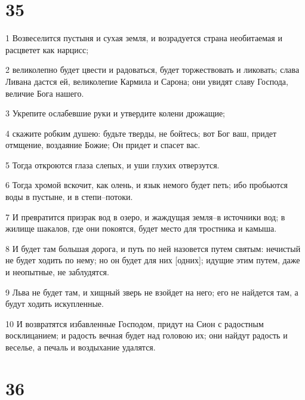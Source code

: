 \chapter{35}

\par 1 Возвеселится пустыня и сухая земля, и возрадуется страна необитаемая и расцветет как нарцисс;
\par 2 великолепно будет цвести и радоваться, будет торжествовать и ликовать; слава Ливана дастся ей, великолепие Кармила и Сарона; они увидят славу Господа, величие Бога нашего.
\par 3 Укрепите ослабевшие руки и утвердите колени дрожащие;
\par 4 скажите робким душею: будьте тверды, не бойтесь; вот Бог ваш, придет отмщение, воздаяние Божие; Он придет и спасет вас.
\par 5 Тогда откроются глаза слепых, и уши глухих отверзутся.
\par 6 Тогда хромой вскочит, как олень, и язык немого будет петь; ибо пробьются воды в пустыне, и в степи--потоки.
\par 7 И превратится призрак вод в озеро, и жаждущая земля--в источники вод; в жилище шакалов, где они покоятся, будет место для тростника и камыша.
\par 8 И будет там большая дорога, и путь по ней назовется путем святым: нечистый не будет ходить по нему; но он будет для них [одних]; идущие этим путем, даже и неопытные, не заблудятся.
\par 9 Льва не будет там, и хищный зверь не взойдет на него; его не найдется там, а будут ходить искупленные.
\par 10 И возвратятся избавленные Господом, придут на Сион с радостным восклицанием; и радость вечная будет над головою их; они найдут радость и веселье, а печаль и воздыхание удалятся.

\chapter{36}

